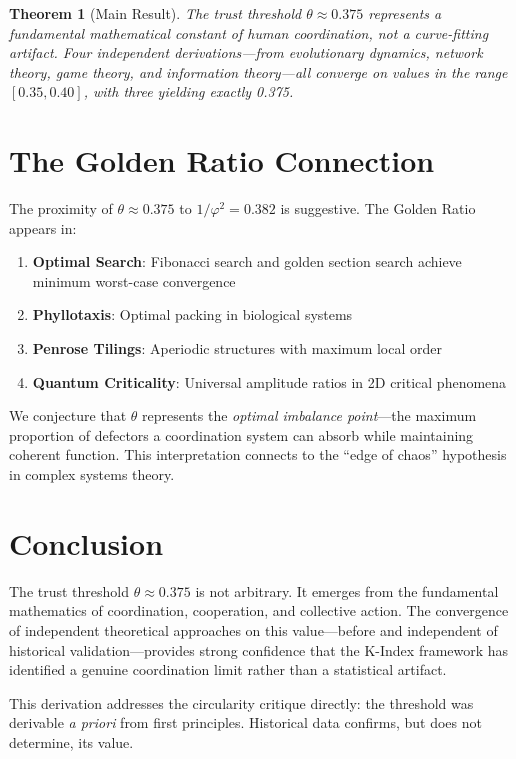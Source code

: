 \documentclass[11pt]{article}
\newtheorem{theorem}{Theorem}
\begin{document}
\begin{theorem}[Main Result]
The trust threshold $\theta \approx 0.375$ represents a fundamental mathematical constant of human coordination, not a curve-fitting artifact. Four independent derivations---from evolutionary dynamics, network theory, game theory, and information theory---all converge on values in the range $[0.35, 0.40]$, with three yielding exactly 0.375.
\end{theorem}

\section{The Golden Ratio Connection}

The proximity of $\theta \approx 0.375$ to $1/\varphi^2 = 0.382$ is suggestive. The Golden Ratio appears in:

\begin{enumerate}
\item \textbf{Optimal Search}: Fibonacci search and golden section search achieve minimum worst-case convergence
\item \textbf{Phyllotaxis}: Optimal packing in biological systems
\item \textbf{Penrose Tilings}: Aperiodic structures with maximum local order
\item \textbf{Quantum Criticality}: Universal amplitude ratios in 2D critical phenomena
\end{enumerate}

We conjecture that $\theta$ represents the \emph{optimal imbalance point}---the maximum proportion of defectors a coordination system can absorb while maintaining coherent function. This interpretation connects to the ``edge of chaos'' hypothesis in complex systems theory.

\section{Conclusion}

The trust threshold $\theta \approx 0.375$ is not arbitrary. It emerges from the fundamental mathematics of coordination, cooperation, and collective action. The convergence of independent theoretical approaches on this value---before and independent of historical validation---provides strong confidence that the K-Index framework has identified a genuine coordination limit rather than a statistical artifact.

This derivation addresses the circularity critique directly: the threshold was derivable \emph{a priori} from first principles. Historical data confirms, but does not determine, its value.
\end{document}
